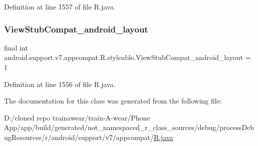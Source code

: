 Definition at line 1557 of file R.\+java.

\mbox{\label{classandroid_1_1support_1_1v7_1_1appcompat_1_1_r_1_1styleable_a1850da4fab00e8c58cb80eccbffa9339}} 
\subsubsection{\texorpdfstring{ViewStubCompat\_android\_layout}{ViewStubCompat\_android\_layout}}
{\footnotesize\ttfamily final int android.\+support.\+v7.\+appcompat.\+R.\+styleable.\+View\+Stub\+Compat\+\_\+android\+\_\+layout = 1\hspace{0.3cm}{\ttfamily [static]}}



Definition at line 1556 of file R.\+java.



The documentation for this class was generated from the following file\+:\begin{DoxyCompactItemize}
\item 
D\+:/cloned repo trainawear/train-\/\+A-\/wear/\+Phone App/app/build/generated/not\+\_\+namespaced\+\_\+r\+\_\+class\+\_\+sources/debug/process\+Debug\+Resources/r/android/support/v7/appcompat/\mbox{\hyperlink{process_debug_resources_2r_2android_2support_2v7_2appcompat_2_r_8java}{R.\+java}}\end{DoxyCompactItemize}
